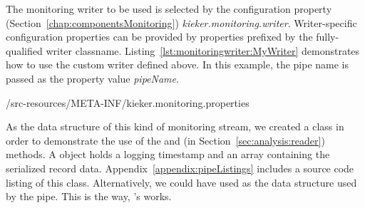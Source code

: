 \setJavaCodeListing



\pagebreak

\noindent The monitoring writer to be used is selected by the %
\KiekerMonitoringPart{} configuration property (Section~\ref{chap:componentsMonitoring}) %
\textit{kieker.monitoring.writer}. Writer-specific configuration properties %
can be provided by properties prefixed by the fully-qualified writer classname.  %
Listing~\ref{lst:monitoringwriter:MyWriter} demonstrates how to use the custom %
writer  defined above. In this example, the pipe name is %
passed as the property value \textit{pipeName}.

\setPropertiesListing
%
{\customComponentsBookstoreApplicationDir/src-resources/META-INF/kieker.monitoring.properties}

\enlargethispage{1cm}

\noindent As the data structure of this kind of monitoring stream, we created a %
class  in order to demonstrate the use of the  and %
 (in Section~\ref{sec:analysis:reader}) methods. %
A  object holds a logging timestamp and an  array %
containing the serialized record data. %
Appendix~\ref{appendix:pipeListings} includes a source code listing of this class. %
Alternatively, we could have used  as the data structure %
used by the pipe. This is the way, \Kieker{}'s  works. %
